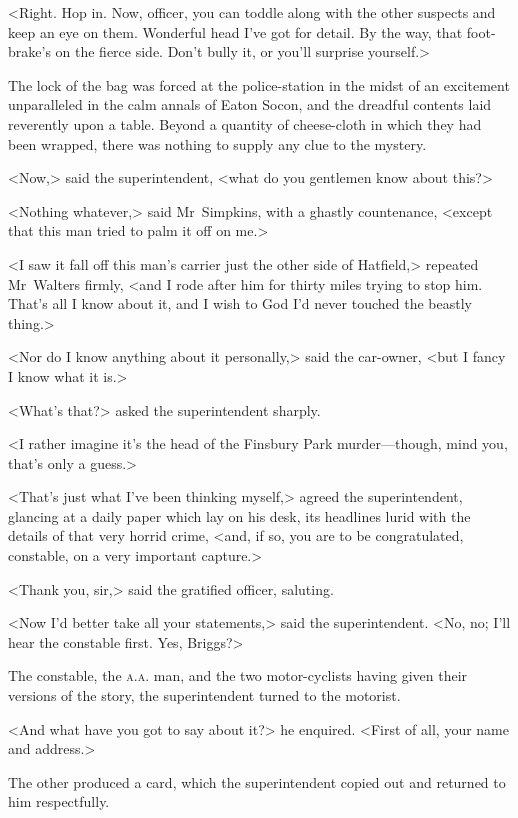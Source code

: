 <Right. Hop in. Now, officer, you can toddle along with the other suspects and keep an eye on them. Wonderful head I've got for detail. By the way, that foot-brake's on the fierce side. Don't bully it, or you'll surprise yourself.>

The lock of the bag was forced at the police-station in the midst of an excitement unparalleled in the calm annals of Eaton Socon, and the dreadful contents laid reverently upon a table. Beyond a quantity of cheese-cloth in which they had been wrapped, there was nothing to supply any clue to the mystery.

<Now,> said the superintendent, <what do you gentlemen know about this?>

<Nothing whatever,> said Mr~Simpkins, with a ghastly countenance, <except that this man tried to palm it off on me.>

<I saw it fall off this man's carrier just the other side of Hatfield,> repeated Mr~Walters firmly, <and I rode after him for thirty miles trying to stop him. That's all I know about it, and I wish to God I'd never touched the beastly thing.>

<Nor do I know anything about it personally,> said the car-owner, <but I fancy I know what it is.>

<What's that?> asked the superintendent sharply.

<I rather imagine it's the head of the Finsbury Park murder—though, mind you, that's only a guess.>

<That's just what I've been thinking myself,> agreed the superintendent, glancing at a daily paper which lay on his desk, its headlines lurid with the details of that very horrid crime, <and, if so, you are to be congratulated, constable, on a very important capture.>

<Thank you, sir,> said the gratified officer, saluting.

<Now I'd better take all your statements,> said the superintendent. <No, no; I'll hear the constable first. Yes, Briggs?>

The constable, the \textsc{a.a.} man, and the two motor-cyclists having given their versions of the story, the superintendent turned to the motorist.

<And what have you got to say about it?> he enquired. <First of all, your name and address.>

The other produced a card, which the superintendent copied out and returned to him respectfully.

